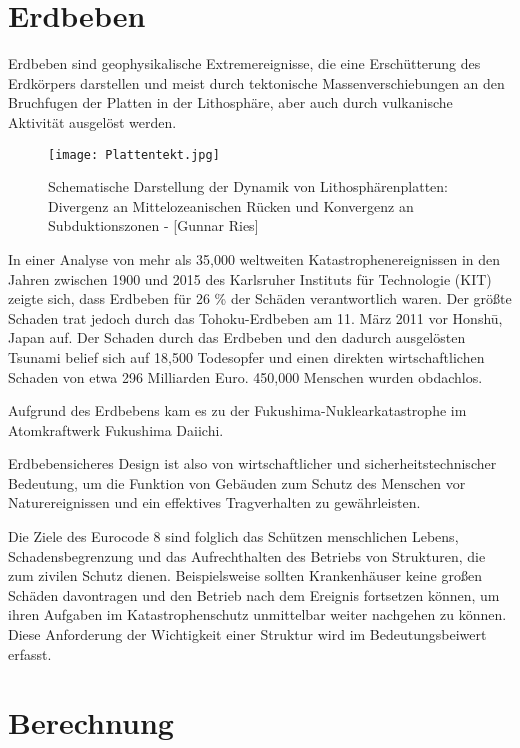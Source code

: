 \section{Erdbeben}
\label{sec:erdbeben}

Erdbeben sind geophysikalische Extremereignisse, die eine Erschütterung des Erdkörpers darstellen und meist durch tektonische Massenverschiebungen an den Bruchfugen der Platten in der Lithosphäre, aber auch durch vulkanische Aktivität ausgelöst werden. \cite{ETHZ}

\begin{figure}[ht]
    \centering
    \texttt{[image: Plattentekt.jpg]}
    \caption{Schematische Darstellung der Dynamik von Lithosphärenplatten: Divergenz an Mittelozeanischen Rücken und Konvergenz an Subduktionszonen - [Gunnar Ries]}
\end{figure}

In einer Analyse von mehr als 35,000 weltweiten Katastrophenereignissen in den Jahren zwischen 1900 und 2015 des Karlsruher Instituts für Technologie (KIT) zeigte sich, dass Erdbeben für 26 \% der Schäden verantwortlich waren.
Der größte Schaden trat jedoch durch das Tohoku-Erdbeben am 11. März 2011 vor Honshū, Japan auf. Der Schaden durch das Erdbeben und den dadurch ausgelösten Tsunami belief sich auf 18,500 Todesopfer und einen direkten wirtschaftlichen Schaden von etwa 296 Milliarden Euro. 450,000 Menschen wurden obdachlos. \cite{DANIELL}

Aufgrund des Erdbebens kam es zu der Fukushima-Nuklearkatastrophe im Atomkraftwerk Fukushima Daiichi.

Erdbebensicheres Design ist also von wirtschaftlicher und sicherheitstechnischer Bedeutung, um die Funktion von Gebäuden zum Schutz des Menschen vor Naturereignissen und ein effektives Tragverhalten zu gewährleisten.

Die Ziele des Eurocode 8 sind folglich das Schützen menschlichen Lebens, Schadensbegrenzung und das Aufrechthalten des Betriebs von Strukturen, die zum zivilen Schutz dienen. Beispielsweise sollten Krankenhäuser keine großen Schäden davontragen und den Betrieb nach dem Ereignis fortsetzen können, um ihren Aufgaben im Katastrophenschutz unmittelbar weiter nachgehen zu können.
Diese Anforderung der Wichtigkeit einer Struktur wird im Bedeutungsbeiwert erfasst. \cite{EC8}

\section{Berechnung}
\label{sec:berechnung}

